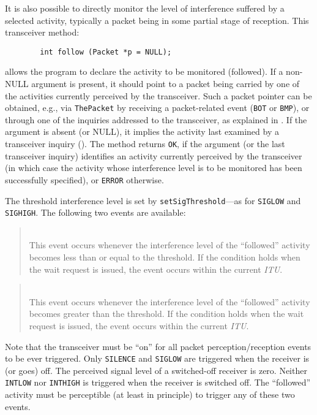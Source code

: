 It is also possible to directly monitor the level of interference suffered by
a selected activity, typically a packet being in some partial stage of
reception.
This transceiver method:
\begin{verbatim}
        int follow (Packet *p = NULL);
\end{verbatim}
allows the program to declare the activity to be monitored (followed).
If a non-NULL argument is present, it should point to a packet being carried
by one of the activities currently perceived by the transceiver.
Such a packet pointer can be obtained, e.g., via {\tt ThePacket} by receiving
a packet-related event ({\tt BOT} or {\tt BMP}), or through one of the
inquiries addressed to the transceiver, as explained in .
If the argument is absent (or NULL), it implies the activity last
examined by a transceiver inquiry ().
The method returns {\tt OK}, if the argument (or the
last transceiver inquiry) identifies an activity currently perceived by
the transceiver (in which case the activity whose interference level is to
be monitored has been successfully specified), or {\tt ERROR} otherwise.

The threshold interference level is set by {\tt setSigThreshold}---as for
{\tt SIGLOW} and {\tt SIGHIGH}.
The following two events are available:

\begin{quote}
\noindent{}\\ \hspace{0in}
This event occurs whenever the interference level of the ``followed''
activity becomes less than or equal to the threshold.
If the condition holds when the wait request is issued, the event occurs
within the current {\em ITU}.
\end{quote}

\begin{quote}
\noindent{}\\ \hspace{0in}
This event occurs whenever the interference level of the ``followed''
activity becomes greater than the threshold.
If the condition holds when the wait request is issued, the event occurs
within the current {\em ITU}.
\end{quote}

Note that the transceiver must be ``on'' for all packet perception/reception
events to be ever triggered.
Only {\tt SILENCE} and {\tt SIGLOW} are triggered when the receiver is
(or goes) off.
The perceived signal level of a switched-off receiver is zero.
Neither {\tt INTLOW} nor {\tt INTHIGH} is triggered when the receiver is
switched off.
The ``followed'' activity must be perceptible (at least in principle) to
trigger any of these two events.

